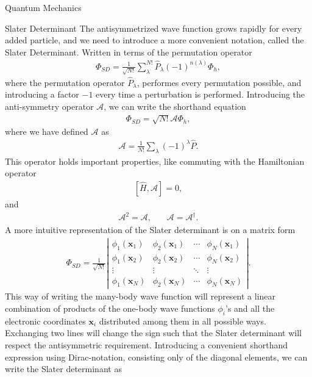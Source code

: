 \documentclass[twoside,english]{uiofysmaster}
\begin{document}
\begin{chapter}{Quantum Mechanics}
	\begin{section}{Slater Determinant}
		The antisymmetrized wave function grows rapidly for every added particle, and we need to introduce a more convenient notation, called the Slater Determinant. Written in terms of the permutation operator \cite{Audun}
		\begin{align}
			\Phi_{SD} = \frac{1}{\sqrt{N!}} \sum_\lambda^{N!} \hat P_\lambda (-1)^{n(\lambda)} \Phi_h,		 	
		\end{align} 
		where the permutation operator $\hat P_{\lambda}$, performes every permutation possible, and introducing a factor $-1$ every time a perturbation is performed. Introducing the anti-symmetry operator $\mathcal{A}$, we can write the shorthand equation
		\begin{align}
			\Phi_{SD} = \sqrt{N!}\mathcal{A}\Phi_h,
			\label{equation:SlaterDeterminant}
		\end{align}
		where we have defined $\mathcal{A}$ as \cite{MHJSlides}
		\begin{align}
			\mathcal{A} = \frac{1}{N!} \sum_\lambda (-1)^\lambda \hat P.
		\end{align}
		This operator holds important properties, like commuting with the Hamiltonian operator
		\begin{align}
			\left[\hat H, \mathcal{A}\right] = 0,
		\end{align}
		and 
		\begin{align}
			\mathcal{A}^2 = \mathcal{A}, \:\:\:\:\:\:\:\: \mathcal{A} = \mathcal{A}^\dagger.
			\label{equation:OperatorA}
		\end{align}
		A more intuitive representation of the Slater determinant is on a matrix form 
		\begin{align}
			\Phi_{SD} = \frac{1}{ \sqrt{N!} } \left|\begin{matrix}
				\phi_1(\mathbf{x}_1) & \phi_2(\mathbf{x}_1) & \cdots & \phi_N(\mathbf{x}_1) \\
				\phi_1(\mathbf{x}_2) & \phi_2(\mathbf{x}_2) & \cdots & \phi_N(\mathbf{x}_2) \\
				\vdots & \vdots & \ddots & \vdots \\
				\phi_1(\mathbf{x}_N) & \phi_2(\mathbf{x}_N) & \cdots & \phi_N(\mathbf{x}_N) 
			\end{matrix} \right|.
		\end{align}
		This way of writing the many-body wave function will represent a linear combination of products of the one-body wave functions $\phi_i$'s and all the electronic coordinates $\mathbf{x}_i$ distributed among them in all possible ways. Exchanging two lines will change the sign such that the Slater determinant will respect the antisymmetric requirement. Introducing a convenient shorthand expression using Dirac-notation, consisting only of the diagonal elements, we can write the Slater determinant as \cite{Crawford}

\end{section}
\end{chapter}
\end{document}
